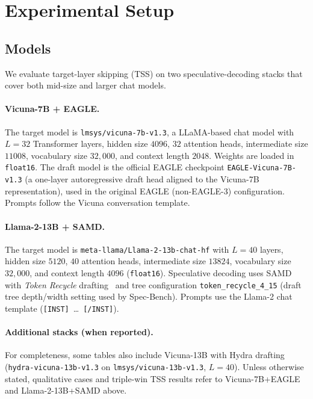 
\section{Experimental Setup}
\label{sec:setup}

\subsection{Models}
\label{sec:setup-models}

We evaluate target-layer skipping (TSS) on two speculative-decoding stacks that cover both mid-size and larger chat models.

\paragraph{Vicuna-7B + EAGLE.}
The target model is \texttt{lmsys/vicuna-7b-v1.3}, a LLaMA-based chat model with $L{=}32$ Transformer layers, hidden size $4096$, $32$ attention heads, intermediate size $11008$, vocabulary size $32{,}000$, and context length $2048$.
Weights are loaded in \texttt{float16}.
The draft model is the official EAGLE checkpoint \texttt{EAGLE-Vicuna-7B-v1.3} (a one-layer autoregressive draft head aligned to the Vicuna-7B representation), used in the original EAGLE (non-EAGLE-3) configuration.
Prompts follow the Vicuna conversation template.

\paragraph{Llama-2-13B + SAMD.}
The target model is \texttt{meta-llama/Llama-2-13b-chat-hf} with $L{=}40$ layers, hidden size $5120$, $40$ attention heads, intermediate size $13824$, vocabulary size $32{,}000$, and context length $4096$ (\texttt{float16}).
Speculative decoding uses SAMD with \emph{Token Recycle} drafting~\cite{samd} and tree configuration \texttt{token\_recycle\_4\_15} (draft tree depth/width setting used by Spec-Bench).
Prompts use the Llama-2 chat template (\texttt{[INST]}~\ldots~\texttt{[/INST]}).

\paragraph{Additional stacks (when reported).}
For completeness, some tables also include Vicuna-13B with Hydra drafting (\texttt{hydra-vicuna-13b-v1.3} on \texttt{lmsys/vicuna-13b-v1.3}, $L{=}40$).
Unless otherwise stated, qualitative cases and triple-win TSS results refer to Vicuna-7B+EAGLE and Llama-2-13B+SAMD above.

